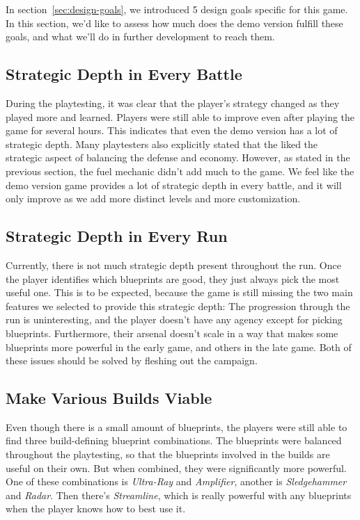 In section~\ref{sec:design-goals}, we introduced 5 design goals specific for this game.
In this section, we'd like to assess how much does the demo version fulfill these goals, and what we'll do in further development to reach them.

\subsection{Strategic Depth in Every Battle}

During the playtesting, it was clear that the player's strategy changed as they played more and learned.
Players were still able to improve even after playing the game for several hours.
This indicates that even the demo version has a lot of strategic depth.
Many playtesters also explicitly stated that the liked the strategic aspect of balancing the defense and economy.
However, as stated in the previous section, the fuel mechanic didn't add much to the game.
We feel like the demo version game provides a lot of strategic depth in every battle, and it will only improve as we add more distinct levels and more customization.

\subsection{Strategic Depth in Every Run}

Currently, there is not much strategic depth present throughout the run.
Once the player identifies which blueprints are good, they just always pick the most useful one.
This is to be expected, because the game is still missing the two main features we selected to provide this strategic depth:
The progression through the run is uninteresting, and the player doesn't have any agency except for picking blueprints.
Furthermore, their arsenal doesn't scale in a way that makes some blueprints more powerful in the early game, and others in the late game.
Both of these issues should be solved by fleshing out the campaign.

\subsection{Make Various Builds Viable}

Even though there is a small amount of blueprints, the players were still able to find three build-defining blueprint combinations.
The blueprints were balanced throughout the playtesting, so that the blueprints involved in the builds are useful on their own.
But when combined, they were significantly more powerful.
One of these combinations is \emph{Ultra-Ray} and \emph{Amplifier}, another is \emph{Sledgehammer} and \emph{Radar}.
Then there's \emph{Streamline}, which is really powerful with any blueprints when the player knows how to best use it.


